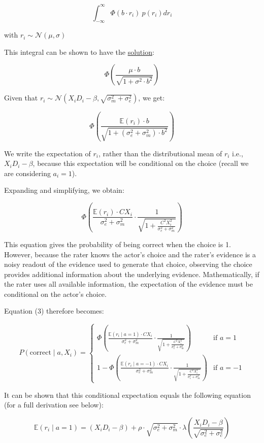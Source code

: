 \documentclass[
]{article}
\begin{document}
\[
\int_{-\infty}^\infty \Phi(b \cdot r_i) \ p(r_i) dr_i
\]

with \(r_i \sim \mathcal{N}(\mu,\sigma)\)

This integral can be shown to have the
\href{https://www.tandfonline.com/doi/abs/10.1080/03610918008812164}{solution}:

\[
\Phi \left(\frac{\mu \cdot b}{\sqrt{1+\sigma^2 \cdot b^2}}\right)
\]

Given that
\(r_i \sim \mathcal{N}(X_iD_i - \beta, \sqrt{\sigma_m^2+\sigma_e^2})\),
we get:

\[
\Phi \left(\frac{\mathbb{E}(r_i) \cdot b}{\sqrt{1+(\sigma_e^2+\sigma_m^2) \cdot b^2}}\right)
\]

We write the expectation of \(r_i\), rather than the distributional mean
of \(r_i\) i.e., \(X_iD_i - \beta\), because this expectation will be
conditional on the choice (recall we are considering \(a_i = 1\)).

Expanding and simplifying, we obtain:

\[
\Phi\left(\frac{\mathbb{E}(r_i) \cdot CX_i}{ \sigma_e^2 + \sigma_m^2} \cdot\frac{1} {\sqrt{1 + \frac{C^2X^2_i}{\sigma_e^2+\sigma_m^2}}}\right)
\]

This equation gives the probability of being correct when the choice is
1. However, because the rater knows the actor's choice and the rater's
evidence is a noisy readout of the evidence used to generate that
choice, observing the choice provides additional information about the
underlying evidence. Mathematically, if the rater uses all available
information, the expectation of the evidence must be conditional on the
actor's choice.

Equation (3) therefore becomes:

\[
P(\text{correct} \mid a, X_i) = \begin{cases}
\Phi\left(\frac{\mathbb{E}(r_i \mid a = 1) \cdot CX_i}{\sigma_e^2 + \sigma_m^2} \cdot \frac{1}{\sqrt{1 + \frac{C^2X^2_i}{\sigma_e^2+\sigma_m^2}}}\right) & \text{if } a = 1 \\ 
1 - \Phi\left(\frac{\mathbb{E}(r_i \mid a = -1) \cdot CX_i}{\sigma_e^2 + \sigma_m^2} \cdot \frac{1}{\sqrt{1 + \frac{C^2X^2_i}{\sigma_e^2+\sigma_m^2}}}\right) & \text{if } a = -1
\end{cases} \tag{4}
\]

It can be shown that this conditional expectation equals the following
equation (for a full derivation see below):

\[
\mathbb{E}(r_i \mid a = 1) = (X_iD_i - \beta) + \rho \cdot \sqrt{\sigma_e^2 + \sigma_m^2} \cdot \lambda\left(\frac{X_iD_i - \beta}{\sqrt{\sigma_e^2 + \sigma_c^2}}\right)
\]
\end{document}
